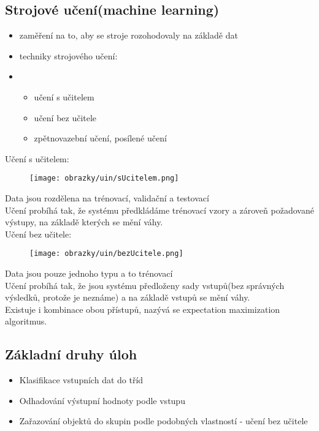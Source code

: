 \subsection*{Strojové učení(machine learning)}
\begin{itemize}
    \item zaměření na to, aby se stroje rozohodovaly na základě dat
    \item techniky strojového učení:
    \item \begin{itemize}
        \item učení s učitelem
        \item učení bez učitele
        \item zpětnovazební učení, posílené učení
    \end{itemize}
\end{itemize}
Učení s učitelem:
\begin{figure}[H]
    \texttt{[image: obrazky/uin/sUcitelem.png]}
\end{figure}
Data jsou rozdělena na trénovací, validační a testovací\\
Učení probíhá tak, že systému předkládáme trénovací vzory a zároveň požadované výstupy, na základě kterých se mění váhy.\\
\newpage
Učení bez učitele:
\begin{figure}[H]
    \texttt{[image: obrazky/uin/bezUcitele.png]}
\end{figure}
Data jsou pouze jednoho typu a to trénovací\\
Učení probíhá tak, že jsou systému předloženy sady vstupů(bez správných výsledků, protože je neznáme) a na základě vstupů se mění váhy.\\

Existuje i kombinace obou přístupů, nazývá se expectation maximization algoritmus.

\subsection*{Základní druhy úloh}
\begin{itemize}
    \item Klasifikace vstupních dat do tříd
    \item Odhadování výstupní hodnoty podle vstupu
    \item Zařazování objektů do skupin podle podobných vlastností - učení bez učitele
\end{itemize}